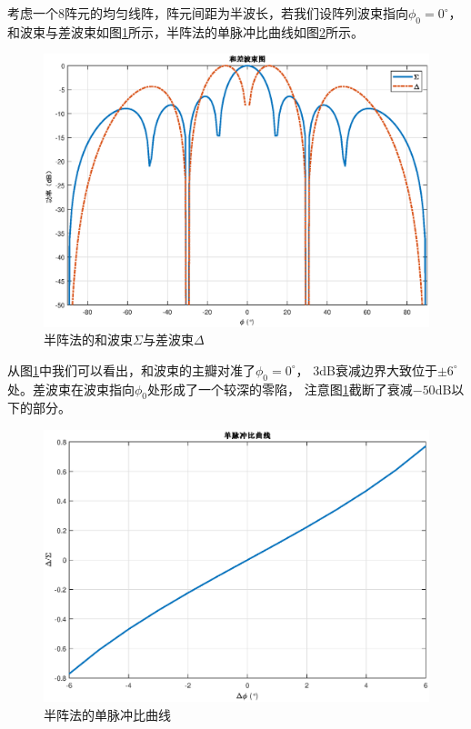 \documentclass[master]{thesis-uestc}
\begin{document}
考虑一个$8$阵元的均匀线阵，阵元间距为半波长，若我们设阵列波束指向$\phi_0=0^\circ$，
和波束与差波束如图\ref{semi_sigma_delta}所示，半阵法的单脉冲比曲线如图\ref{semi_MRC_figure}所示。
\begin{figure}[H]
\includegraphics[scale=0.5]{pic/semi_sigma_delta.eps}
\caption{半阵法的和波束$\Sigma$与差波束$\Delta$}
\label{semi_sigma_delta}
\end{figure}

从图\ref{semi_sigma_delta}中我们可以看出，和波束的主瓣对准了$\phi_0=0^\circ$，
$3$dB衰减边界大致位于$\pm6^\circ$处。差波束在波束指向$\phi_0$处形成了一个较深的零陷，
注意图\ref{semi_sigma_delta}截断了衰减$-50$dB以下的部分。

\begin{figure}[H]
\includegraphics[scale=0.5]{pic/semi_MRC.eps}
\caption{半阵法的单脉冲比曲线}
\label{semi_MRC_figure}
\end{figure}
\end{document}
